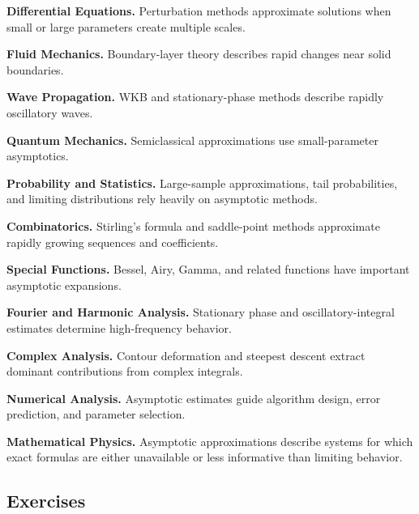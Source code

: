 \begin{applicationbox}
\textbf{Differential Equations.}
Perturbation methods approximate solutions when small or large parameters
create multiple scales.

\medskip

\textbf{Fluid Mechanics.}
Boundary-layer theory describes rapid changes near solid boundaries.

\medskip

\textbf{Wave Propagation.}
WKB and stationary-phase methods describe rapidly oscillatory waves.

\medskip

\textbf{Quantum Mechanics.}
Semiclassical approximations use small-parameter asymptotics.

\medskip

\textbf{Probability and Statistics.}
Large-sample approximations, tail probabilities, and limiting
distributions rely heavily on asymptotic methods.

\medskip

\textbf{Combinatorics.}
Stirling's formula and saddle-point methods approximate rapidly growing
sequences and coefficients.

\medskip

\textbf{Special Functions.}
Bessel, Airy, Gamma, and related functions have important asymptotic
expansions.

\medskip

\textbf{Fourier and Harmonic Analysis.}
Stationary phase and oscillatory-integral estimates determine
high-frequency behavior.

\medskip

\textbf{Complex Analysis.}
Contour deformation and steepest descent extract dominant contributions
from complex integrals.

\medskip

\textbf{Numerical Analysis.}
Asymptotic estimates guide algorithm design, error prediction, and
parameter selection.

\medskip

\textbf{Mathematical Physics.}
Asymptotic approximations describe systems for which exact formulas are
either unavailable or less informative than limiting behavior.
\end{applicationbox}

\subsection{Exercises}
\label{subsec:asymptotic-analysis-exercises}

